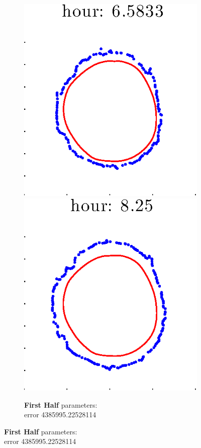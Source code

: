 \documentclass[12pt]{article}
\begin{document}
\begin{figure}[h!]
\begin{subfigure}[b]{.3\textwidth}
		\includegraphics[height=.15\textheight]{Pos0/full/first5.eps}
		\includegraphics[height=.15\textheight]{Pos0/full/first6.eps}
		\caption{\textbf{First Half} parameters: \\error 4385995.22528114}

\end{subfigure}
\end{figure}
\end{document}
